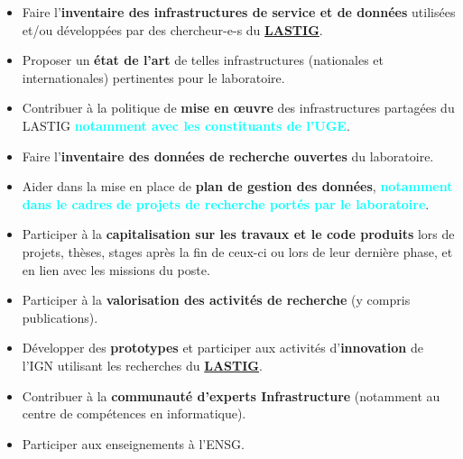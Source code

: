 \documentclass[10pt,a4paper,french]{article}
\newcommand{\LASTIG}{\href{https://www.umr-lastig.fr/}{\bf LASTIG}}
\begin{document}
\begin{itemize}
    \item Faire l'\textbf{inventaire des infrastructures de service et de données} utilisées et/ou développées par des chercheur-e-s du \LASTIG.
    \item Proposer un \textbf{état de l'art} de telles infrastructures (nationales et internationales) pertinentes pour le laboratoire.
    \item Contribuer à la politique de \textbf{mise en \oe uvre} des infrastructures partagées du LASTIG \textcolor{cyan}{\bf{notamment avec les constituants de l'UGE}}.
    \item Faire l'\textbf{inventaire des données de recherche ouvertes} du laboratoire.
    \item Aider dans la mise en place de \textbf{plan de gestion des données}, \textcolor{cyan}{\bf{notamment dans le cadres de projets de recherche portés par le laboratoire}}.
    \item Participer à la \textbf{capitalisation sur les travaux et le code produits} lors de projets, thèses, stages après la fin de ceux-ci ou lors de leur dernière phase, et en lien avec les missions du poste.
    \item Participer à la \textbf{valorisation des activités de recherche} (y compris publications).
    \item Développer des \textbf{prototypes} et participer aux activités d’\textbf{innovation} de l’IGN utilisant les recherches du \LASTIG.
    \item Contribuer à la \textbf{communauté d’experts Infrastructure} (notamment au centre de compétences en informatique).
    \item Participer aux enseignements à l’ENSG.
\end{itemize}



\end{document}
